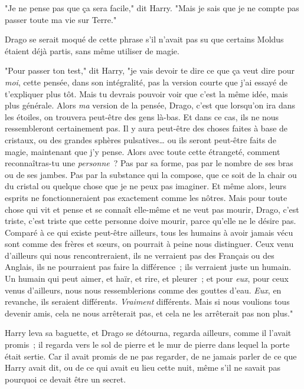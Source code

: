 "Je ne pense pas que ça sera facile," dit Harry. "Mais je sais que je ne compte pas passer toute ma vie sur Terre."

Drago se serait moqué de cette phrase s'il n'avait pas su que certains Moldus étaient déjà partis, sans même utiliser de magie.

"Pour passer ton test," dit Harry, "je vais devoir te dire ce que ça veut dire pour \emph{moi}, cette pensée, dans son intégralité, pas la version courte que j'ai essayé de t'expliquer plus tôt. Mais tu devrais pouvoir voir que c'est la même idée, mais plus générale. Alors \emph{ma} version de la pensée, Drago, c'est que lorsqu'on ira dans les étoiles, on trouvera peut-être des gens là-bas. Et dans ce cas, ils ne nous ressembleront certainement pas. Il y aura peut-être des choses faites à base de cristaux, ou des grandes sphères pulsatives… ou ils seront peut-être faits de magie, maintenant que j'y pense. Alors avec toute cette étrangeté, comment reconnaîtras-tu une \emph{personne}~? Pas par sa forme, pas par le nombre de ses bras ou de ses jambes. Pas par la substance qui la compose, que ce soit de la chair ou du cristal ou quelque chose que je ne peux pas imaginer. Et même alors, leurs esprits ne fonctionneraient pas exactement comme les nôtres. Mais pour toute chose qui vit et pense et se connaît elle-même et ne veut pas mourir, Drago, c'est triste, c'est triste que cette personne doive mourir, parce qu'elle ne le désire pas. Comparé à ce qui existe peut-être ailleurs, tous les humains à avoir jamais vécu sont comme des frères et sœurs, on pourrait à peine nous distinguer. Ceux venu d'ailleurs qui nous rencontreraient, ils ne verraient pas des Français ou des Anglais, ils ne pourraient pas faire la différence~; ils verraient juste un humain. Un humain qui peut aimer, et haïr, et rire, et pleurer~; et pour \emph{eux}, pour ceux venus d'ailleurs, nous nous ressemblerions comme des gouttes d'eau. \emph{Eux}, en revanche, ils seraient différents. \emph{Vraiment} différents. Mais si nous voulions tous devenir amis, cela ne nous arrêterait pas, et cela ne les arrêterait pas non plus."

Harry leva sa baguette, et Drago se détourna, regarda ailleurs, comme il l'avait promis~; il regarda vers le sol de pierre et le mur de pierre dans lequel la porte était sertie. Car il avait promis de ne pas regarder, de ne jamais parler de ce que Harry avait dit, ou de ce qui avait eu lieu cette nuit, même s'il ne savait pas pourquoi ce devait être un secret.

